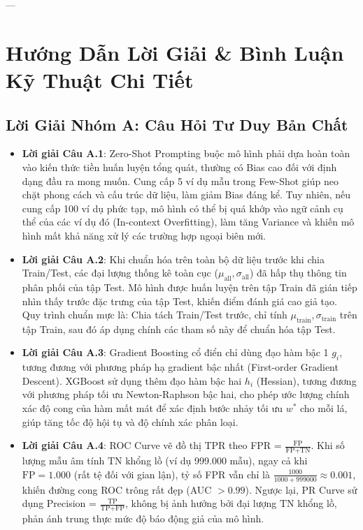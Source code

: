 ---

\section{Hướng Dẫn Lời Giải \& Bình Luận Kỹ Thuật Chi Tiết}
\label{sec:ch05-solutions}

\subsection{Lời Giải Nhóm A: Câu Hỏi Tư Duy Bản Chất}
\begin{itemize}
  \item \textbf{Lời giải Câu A.1}:
  Zero-Shot Prompting buộc mô hình phải dựa hoàn toàn vào kiến thức tiền huấn luyện tổng quát, thường có Bias cao đối với định dạng đầu ra mong muốn. Cung cấp 5 ví dụ mẫu trong Few-Shot giúp neo chặt phong cách và cấu trúc dữ liệu, làm giảm Bias đáng kể. Tuy nhiên, nếu cung cấp 100 ví dụ phức tạp, mô hình có thể bị quá khớp vào ngữ cảnh cụ thể của các ví dụ đó (In-context Overfitting), làm tăng Variance và khiến mô hình mất khả năng xử lý các trường hợp ngoại biên mới.

  \item \textbf{Lời giải Câu A.2}:
  Khi chuẩn hóa trên toàn bộ dữ liệu trước khi chia Train/Test, các đại lượng thống kê toàn cục ($\mu_{\text{all}}, \sigma_{\text{all}}$) đã hấp thụ thông tin phân phối của tập Test. Mô hình được huấn luyện trên tập Train đã gián tiếp nhìn thấy trước đặc trưng của tập Test, khiến điểm đánh giá cao giả tạo. Quy trình chuẩn mực là: Chia tách Train/Test trước, chỉ tính $\mu_{\text{train}}, \sigma_{\text{train}}$ trên tập Train, sau đó áp dụng chính các tham số này để chuẩn hóa tập Test.

  \item \textbf{Lời giải Câu A.3}:
  Gradient Boosting cổ điển chỉ dùng đạo hàm bậc 1 $g_i$, tương đương với phương pháp hạ gradient bậc nhất (First-order Gradient Descent). XGBoost sử dụng thêm đạo hàm bậc hai $h_i$ (Hessian), tương đương với phương pháp tối ưu Newton-Raphson bậc hai, cho phép ước lượng chính xác độ cong của hàm mất mát để xác định bước nhảy tối ưu $w^*$ cho mỗi lá, giúp tăng tốc độ hội tụ và độ chính xác phân loại.

  \item \textbf{Lời giải Câu A.4}:
  ROC Curve vẽ đồ thị TPR theo FPR = $\frac{\text{FP}}{\text{FP} + \text{TN}}$. Khi số lượng mẫu âm tính $\text{TN}$ khổng lồ (ví dụ 999.000 mẫu), ngay cả khi $\text{FP} = 1.000$ (rất tệ đối với gian lận), tỷ số FPR vẫn chỉ là $\frac{1000}{1000 + 999000} \approx 0.001$, khiến đường cong ROC trông rất đẹp (AUC $> 0.99$). Ngược lại, PR Curve sử dụng Precision = $\frac{\text{TP}}{\text{TP} + \text{FP}}$, không bị ảnh hưởng bởi đại lượng $\text{TN}$ khổng lồ, phản ánh trung thực mức độ báo động giả của mô hình.


\end{itemize}
